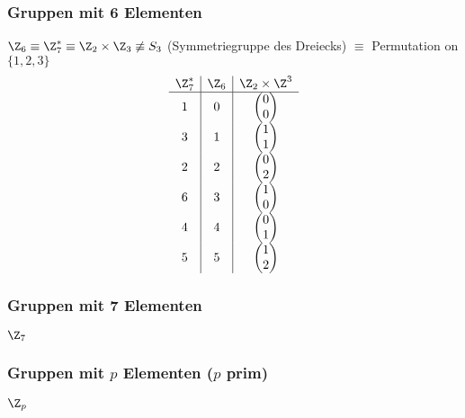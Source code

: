 \subsubsection{Gruppen mit 6 Elementen}
$\Z_6 \equiv \Z_7^* \equiv \Z_2 \times \Z_3 \not\equiv S_3$ (Symmetriegruppe des Dreiecks) $\equiv$ Permutation on $\{ 1, 2, 3 \}$\\
\[ \begin{array}{ c | c | c }
	\Z_7^*	&\Z_6	&\Z_2 \times \Z^3				\\ \hline
	1		&0		&\begin{pmatrix}0\\0\end{pmatrix}	\\
	3		&1		&\begin{pmatrix}1\\1\end{pmatrix}	\\
	2		&2		&\begin{pmatrix}0\\2\end{pmatrix}	\\
	6		&3		&\begin{pmatrix}1\\0\end{pmatrix}	\\
	4		&4		&\begin{pmatrix}0\\1\end{pmatrix}	\\
	5		&5		&\begin{pmatrix}1\\2\end{pmatrix}	
\end{array} \]

\subsubsection{Gruppen mit 7 Elementen}
$\Z_7$

\subsubsection{Gruppen mit \texorpdfstring{$p$}{p} Elementen (\texorpdfstring{$p$}{p} prim)}
$\Z_p$

